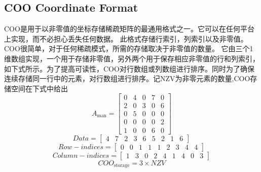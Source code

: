 \documentclass[forprint]{WHUBachelor}
\begin{document}
\subsection{COO Coordinate Format}
COO是用于以非零值的坐标存储稀疏矩阵的最通用格式之一\cite{Choi2015Design}。它可以在任何平台上实现，而不必担心丢失任何数据。 此格式存储行索引，列索引以及非零值。 COO很简单，对于任何稀疏模式，所需的存储取决于非零值的数量。 它由三个1维数组实现，一个用于存储非零值，另外两个用于保存相应非零值的行和列索引，如下式所示。为了提高可读性，COO对行数组或列数组进行排序。同时为了确保连续存储同一行中的元素，对行数组进行排序。记NZV为非零元素的数量,COO存储空间在下式中给出
\begin {equation} 
A_{\operatorname{man}}=\left[ \begin{array}{ccccc}{0} & {4} & {0} & {7} & {0} \\ {2} & {0} & {3} & {0} & {6} \\ {0} & {5} & {0} & {0} & {0} \\ {0} & {0} & {0} & {0} & {2} \\ {1} & {0} & {0} & {6} & {0}\end{array}\right]
 \end {equation}
\begin{equation} 
D a t a=\left[ \begin{array}{lllllllll}{4} & {7} & {2} & {3} & {6} & {5} & {2} & {1} & {6}\end{array}\right]
 \end{equation}
\begin{equation} 
Row-indices = \left[ \begin{array}{lllllllll}{0} & {0} & {1} & {1} & {1} & {2} & {3} & {4} & {4}\end{array}\right]
 \end{equation}
\begin{equation} 
Column-indices = \left[ \begin{array}{lllllllll}{1} & {3} & {0} & {2} & {4} & {1} & {4} & {0} & {3}\end{array}\right]
 \end{equation}
\begin {equation} 
C O O_{\text {storage}}=3 \times N Z V
 \end {equation}
\end{document}
